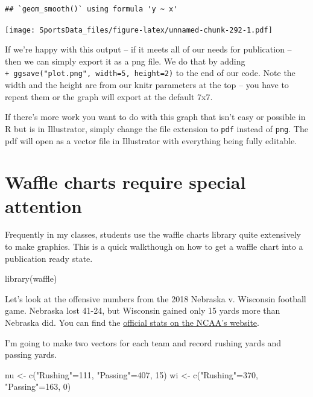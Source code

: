 \documentclass[
]{book}
\newenvironment{Shaded}{\begin{snugshade}}{\end{snugshade}}
\newcommand{\DecValTok}[1]{\textcolor[rgb]{0.00,0.00,0.81}{#1}}
\newcommand{\FunctionTok}[1]{\textcolor[rgb]{0.00,0.00,0.00}{#1}}
\newcommand{\NormalTok}[1]{#1}
\newcommand{\OtherTok}[1]{\textcolor[rgb]{0.56,0.35,0.01}{#1}}
\newcommand{\StringTok}[1]{\textcolor[rgb]{0.31,0.60,0.02}{#1}}
\begin{document}
\begin{verbatim}
## `geom_smooth()` using formula 'y ~ x'
\end{verbatim}

\texttt{[image: SportsData\_files/figure-latex/unnamed-chunk-292-1.pdf]}

If we're happy with this output -- if it meets all of our needs for publication -- then we can simply export it as a png file. We do that by adding \texttt{+\ ggsave("plot.png",\ width=5,\ height=2)} to the end of our code. Note the width and the height are from our knitr parameters at the top -- you have to repeat them or the graph will export at the default 7x7.

If there's more work you want to do with this graph that isn't easy or possible in R but is in Illustrator, simply change the file extension to \texttt{pdf} instead of \texttt{png}. The pdf will open as a vector file in Illustrator with everything being fully editable.

\hypertarget{waffle-charts-require-special-attention}{%
\section{Waffle charts require special attention}\label{waffle-charts-require-special-attention}}

Frequently in my classes, students use the waffle charts library quite extensively to make graphics. This is a quick walkthough on how to get a waffle chart into a publication ready state.

\begin{Shaded}
\begin{Highlighting}[]
\FunctionTok{library}\NormalTok{(waffle)}
\end{Highlighting}
\end{Shaded}

Let's look at the offensive numbers from the 2018 Nebraska v. Wisconsin football game. Nebraska lost 41-24, but Wisconsin gained only 15 yards more than Nebraska did. You can find the \href{https://www.ncaa.com/game/football/fbs/2018/10/06/nebraska-wisconsin/team-stats}{official stats on the NCAA's website}.

I'm going to make two vectors for each team and record rushing yards and passing yards.

\begin{Shaded}
\begin{Highlighting}[]
\NormalTok{nu }\OtherTok{\textless{}{-}} \FunctionTok{c}\NormalTok{(}\StringTok{"Rushing"}\OtherTok{=}\DecValTok{111}\NormalTok{, }\StringTok{"Passing"}\OtherTok{=}\DecValTok{407}\NormalTok{, }\DecValTok{15}\NormalTok{)}
\NormalTok{wi }\OtherTok{\textless{}{-}} \FunctionTok{c}\NormalTok{(}\StringTok{"Rushing"}\OtherTok{=}\DecValTok{370}\NormalTok{, }\StringTok{"Passing"}\OtherTok{=}\DecValTok{163}\NormalTok{, }\DecValTok{0}\NormalTok{)}
\end{Highlighting}
\end{Shaded}
\end{document}
